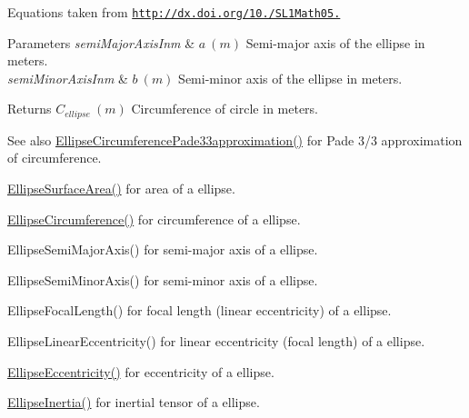 Equations taken from \href{http://dx.doi.org/10.3247/SL1Math05.004}{\tt http\+://dx.\+doi.\+org/10./\+S\+L1\+Math05.} 
\begin{DoxyParams}{Parameters}
{\em semi\+Major\+Axis\+Inm} & $ a\ (m)$ Semi-\/major axis of the ellipse in meters. \\
\hline
{\em semi\+Minor\+Axis\+Inm} & $ b\ (m)$ Semi-\/minor axis of the ellipse in meters. \\
\hline
\end{DoxyParams}
\begin{DoxyReturn}{Returns}
$ C_{ellipse}\ (m)$ Circumference of circle in meters. 
\end{DoxyReturn}
\begin{DoxySeeAlso}{See also}
\mbox{\hyperlink{group___e_g_x_math-_geometry-2_d-_ellipse-_circumference_ga0e0b290f1da2605c16ec13b9e221769d}{Ellipse\+Circumference\+Pade33approximation()}} for Pade 3/3 approximation of circumference. 

\mbox{\hyperlink{group___e_g_x_math-_geometry-2_d-_ellipse-_surface_area_ga4ce8c8323e9718ce5458f4ab7f6d823d}{Ellipse\+Surface\+Area()}} for area of a ellipse. 

\mbox{\hyperlink{group___e_g_x_math-_geometry-2_d-_ellipse-_circumference_ga4172802ac674eb53467b44928ac635c7}{Ellipse\+Circumference()}} for circumference of a ellipse. 

Ellipse\+Semi\+Major\+Axis() for semi-\/major axis of a ellipse. 

Ellipse\+Semi\+Minor\+Axis() for semi-\/minor axis of a ellipse. 

Ellipse\+Focal\+Length() for focal length (linear eccentricity) of a ellipse. 

Ellipse\+Linear\+Eccentricity() for linear eccentricity (focal length) of a ellipse. 

\mbox{\hyperlink{group___e_g_x_math-_geometry-2_d-_ellipse-_eccentricity_ga6a0a7fba17f782616894cfc447628c33}{Ellipse\+Eccentricity()}} for eccentricity of a ellipse. 

\mbox{\hyperlink{group___e_g_x_math-_geometry-2_d-_ellipse-_inertia_ga10a3049c2f04b50f271fb01dc62e4cf8}{Ellipse\+Inertia()}} for inertial tensor of a ellipse. 
\end{DoxySeeAlso}
\mbox{\label{group___e_g_x_math-_geometry-2_d-_ellipse-_circumference_ga2d4ee70e08d6fb4b56209ad4fc3f38ca}} 
